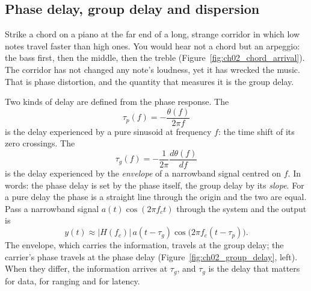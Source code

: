 
\subsection{Phase delay, group delay and dispersion}
\label{sec:ch02:groupdelay}

Strike a chord on a piano at the far end of a long, strange corridor in which low notes travel
faster than high ones. You would hear not a chord but an arpeggio: the bass first, then the middle,
then the treble (Figure~\ref{fig:ch02_chord_arrival}). The corridor has not changed any note's
loudness, yet it has wrecked the music. That is phase distortion, and the quantity that measures it
is the group delay.

Two kinds of delay are defined from the phase response. The 
\begin{equation}
\tau_p(f)=-\frac{\theta(f)}{2\pi f}
\label{eq:ch02:phasedelay}
\end{equation}
is the delay experienced by a pure sinusoid at frequency $f$: the time shift of its zero
crossings. The 
\begin{equation}
\tau_g(f)=-\frac{1}{2\pi}\frac{d\theta(f)}{df}
\label{eq:ch02:groupdelay}
\end{equation}
is the delay experienced by the \emph{envelope} of a narrowband signal centred on $f$. In words: the
phase delay is set by the phase itself, the group delay by its \emph{slope}. For a pure delay the
phase is a straight line through the origin and the two are equal. Pass a narrowband signal
$a(t)\cos(2\pi f_ct)$ through the system and the output is
\begin{equation}
y(t)\approx|H(f_c)|\,a(t-\tau_g)\cos\big(2\pi f_c(t-\tau_p)\big).
\label{eq:ch02:gdpacket}
\end{equation}
The envelope, which carries the information, travels at the group delay; the carrier's phase
travels at the phase delay (Figure~\ref{fig:ch02_group_delay}, left). When they differ, the
information arrives at $\tau_g$, and $\tau_g$ is the delay that matters for data, for ranging and
for latency.

